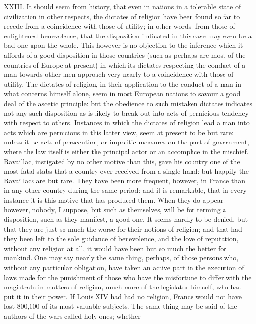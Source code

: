 \documentclass[12pt]{report}
\begin{document}
XXIII. It should seem from history, that even in nations in a tolerable
state of civilization in other respects, the dictates of religion have
been found so far to recede from a coincidence with those of utility; in
other words, from those of enlightened benevolence; that the disposition
indicated in this case may even be a bad one upon the whole. This
however is no objection to the inference which it affords of a good
disposition in those countries (such as perhaps are most of the
countries of Europe at present) in which its dictates respecting the
conduct of a man towards other men approach very nearly to a coincidence
with those of utility. The dictates of religion, in their application to
the conduct of a man in what concerns himself alone, seem in most
European nations to savour a good deal of the ascetic principle: but the
obedience to such mistaken dictates indicates not any such disposition
as is likely to break out into acts of pernicious tendency with respect
to others. Instances in which the dictates of religion lead a man into
acts which are pernicious in this latter view, seem at present to be but
rare: unless it be acts of persecution, or impolitic measures on the
part of government, where the law itself is either the principal actor
or an accomplice in the mischief. Ravaillac, instigated by no other
motive than this, gave his country one of the most fatal stabs that a
country ever received from a single hand: but happily the Ravaillacs are
but rare. They have been more frequent, however, in France than in any
other country during the same period: and it is remarkable, that in
every instance it is this motive that has produced them. When they do
appear, however, nobody, I suppose, but such as themselves, will be for
terming a disposition, such as they manifest, a good one. It seems
hardly to be denied, but that they are just so much the worse for their
notions of religion; and that had they been left to the sole guidance of
benevolence, and the love of reputation, without any religion at all, it
would have been but so much the better for mankind. One may say nearly
the same thing, perhaps, of those persons who, without any particular
obligation, have taken an active part in the execution of laws made for
the punishment of those who have the misfortune to differ with the
magistrate in matters of religion, much more of the legislator himself,
who has put it in their power. If Louis XIV had had no religion, France
would not have lost 800,000 of its most valuable subjects. The same
thing may be said of the authors of the wars called holy ones; whether
\end{document}
